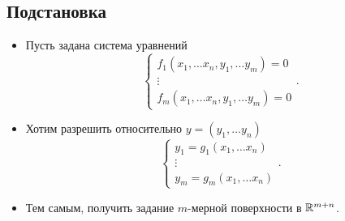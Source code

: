 \documentclass[11pt,dvipsnames]{report}
\begin{document}
\subsection{Подстановка}

\begin{itemize}
    \item Пусть задана система уравнений
	\[
	    \begin{cases}
		f_1(x_1, \ldots x_n, y_1, \ldots y_m) = 0 \\
		\vdots
		\\
		f_m(x_1, \ldots x_n, y_1, \ldots y_m) = 0
	    \end{cases}
	.\]
    \item  Хотим разрешить относительно $ y = (y_1, \ldots y_n)$
	\[
	    \begin{cases}
		y_1= g_1(x_1, \ldots x_{n})\\
		\vdots\\
		y_m = g_m(x_1, \ldots x_n)
	    \end{cases}
	.\]
    \item Тем самым, получить задание $ m$-мерной поверхности в   $ \mathbb{R}^{m+n}$.
\end{itemize}
\end{document}
